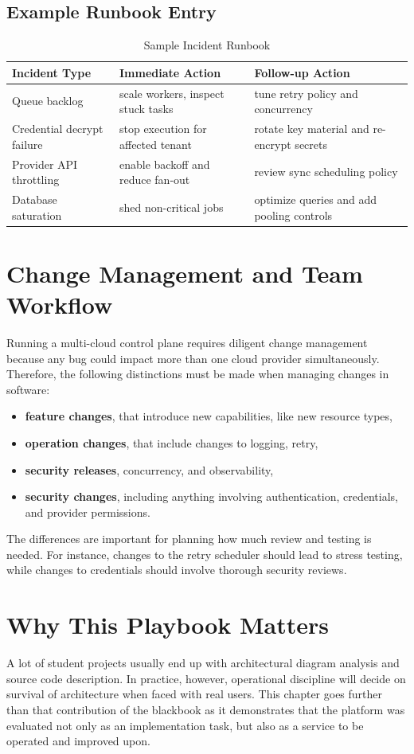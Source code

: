 \subsection{Example Runbook Entry}
\begin{table}[H]
\centering
\caption{Sample Incident Runbook}
\label{tab:incident_runbook}
\begin{tabular}{|p{3.0cm}|p{4.0cm}|p{4.4cm}|}
\hline
\textbf{Incident Type} & \textbf{Immediate Action} & \textbf{Follow-up Action} \\ \hline
Queue backlog & scale workers, inspect stuck tasks & tune retry policy and concurrency \\ \hline
Credential decrypt failure & stop execution for affected tenant & rotate key material and re-encrypt secrets \\ \hline
Provider API throttling & enable backoff and reduce fan-out & review sync scheduling policy \\ \hline
Database saturation & shed non-critical jobs & optimize queries and add pooling controls \\ \hline
\end{tabular}
\end{table}

\section{Change Management and Team Workflow}
Running a multi-cloud control plane requires diligent change management because any bug could impact more than one cloud provider simultaneously. Therefore, the following distinctions must be made when managing changes in software:

\begin{itemize}
    \item \textbf{feature changes}, that introduce new capabilities, like new resource types,
    \item \textbf{operation changes}, that include changes to logging, retry,
    \item \textbf{security releases}, concurrency, and observability,
    \item \textbf{security changes}, including anything involving authentication, credentials, and provider permissions.
\end{itemize}

The differences are important for planning how much review and testing is needed. For instance, changes to the retry scheduler should lead to stress testing, while changes to credentials should involve thorough security reviews.

\section{Why This Playbook Matters}
A lot of student projects usually end up with architectural diagram analysis and source code description. In practice, however, operational discipline will decide on survival of architecture when faced with real users. This chapter goes further than that contribution of the blackbook as it demonstrates that the platform was evaluated not only as an implementation task, but also as a service to be operated and improved upon. 

\newpage
